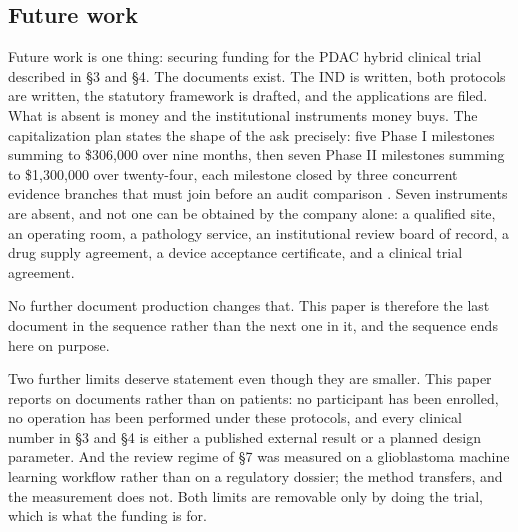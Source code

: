 \subsection{Future work}

Future work is one thing: securing funding for the PDAC hybrid clinical trial
described in \S3 and \S4. The documents exist. The IND is written, both
protocols are written, the statutory framework is drafted, and the applications
are filed. What is absent is money and the institutional instruments money buys.
The capitalization plan states the shape of the ask precisely: five Phase I
milestones summing to \$306,000 over nine months, then seven Phase II milestones
summing to \$1,300,000 over twenty-four, each milestone closed by three
concurrent evidence branches that must join before an audit comparison
\cite{capplan2026}. Seven instruments are absent, and not one can be obtained by
the company alone: a qualified site, an operating room, a pathology service, an
institutional review board of record, a drug supply agreement, a device
acceptance certificate, and a clinical trial agreement.

No further document production changes that. This paper is therefore the last
document in the sequence rather than the next one in it, and the sequence ends
here on purpose.

Two further limits deserve statement even though they are smaller. This paper
reports on documents rather than on patients: no participant has been enrolled,
no operation has been performed under these protocols, and every clinical number
in \S3 and \S4 is either a published external result or a planned design
parameter. And the review regime of \S7 was measured on a glioblastoma machine
learning workflow rather than on a regulatory dossier; the method transfers, and
the measurement does not. Both limits are removable only by doing the trial,
which is what the funding is for.
